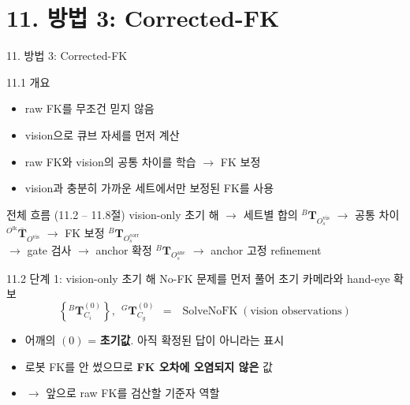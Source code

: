 \documentclass[aspectratio=169,11pt]{beamer}
\newif\ifcorrectedfk
\newcommand{\T}[3][]{{}^{#2}\mathbf{T}^{#1}_{#3}}   %
\newcommand{\Tb}[2]{{}^{#1}\overline{\mathbf{T}}_{#2}} %
\newcommand{\Ofk}{O^{\mathrm{fk}}}     %
\newcommand{\Ovis}{O^{\mathrm{vis}}}   %
\newcommand{\Ocorr}{O^{\mathrm{corr}}} %
\newcommand{\Oanc}{O^{\mathrm{anc}}}   %
\begin{document}
\ifcorrectedfk
\section{11. 방법 3: Corrected-FK}

\begin{frame}{11. 방법 3: Corrected-FK}
  \begin{block}{11.1 개요}
    \begin{itemize}
      \item raw FK를 무조건 믿지 않음
      \item vision으로 큐브 자세를 먼저 계산
      \item raw FK와 vision의 공통 차이를 학습 $\rightarrow$ FK 보정
      \item vision과 충분히 가까운 세트에서만 보정된 FK를 사용
    \end{itemize}
  \end{block}
  \vfill
  \begin{block}{전체 흐름 (11.2 -- 11.8절)}
    \centering\small
    vision-only 초기 해
    $\rightarrow$ 세트별 합의 $\T{B}{\Ovis_s}$
    $\rightarrow$ 공통 차이 $\Tb{\Ofk}{\Ovis}$
    $\rightarrow$ FK 보정 $\T{B}{\Ocorr_s}$\\[1mm]
    $\rightarrow$ gate 검사
    $\rightarrow$ anchor 확정 $\T{B}{\Oanc_s}$
    $\rightarrow$ anchor 고정 refinement
  \end{block}
\end{frame}

\begin{frame}{11.2 단계 1: vision-only 초기 해}
  No-FK 문제를 먼저 풀어 초기 카메라와 hand-eye 확보
  \[
    \left\{\T[(0)]{B}{C_i}\right\},\ \ \T[(0)]{G}{C_g}
    \ \ =\ \
    \operatorname{SolveNoFK}(\text{vision observations})
  \]
  \vfill
  \begin{itemize}
    \item 어깨의 $(0)$ = \textbf{초기값}. 아직 확정된 답이 아니라는 표시
    \item 로봇 FK를 안 썼으므로 \textbf{FK 오차에 오염되지 않은} 값
    \item $\rightarrow$ 앞으로 raw FK를 검산할 기준자 역할
  \end{itemize}
\end{frame}
\end{document}
